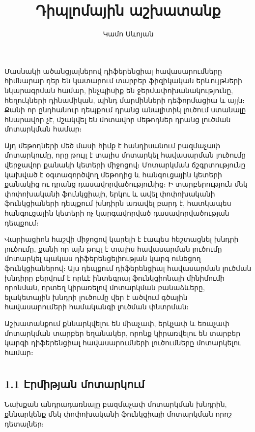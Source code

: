 \documentclass[fleqn, bachelor,subf,12pt,notitlepage]{article}
\title{Դիպլոմային աշխատանք}
\author{Կամո Սևոյան}
\begin{document}
\section*{}

\sloppy

\hspace{\parindent}Մասնակի ածանցյալներով դիֆերենցիալ հավասարումները հիմնարար դեր են կատարում տարբեր ֆիզիկական երևույթների նկարագրման համար, ինչպիսիք են ջերմափոխանակությունը, հեղուկների դինամիկան, պինդ մարմինների դեֆորմացիա և այլն։ Քանի որ ընդհանուր դեպքում դրանց անալիտիկ լուծում ստանալը հնարավոր չէ, մշակվել են մոտավոր մեթոդներ դրանց լուծման մոտարկման համար։ 

Այդ մեթոդների մեծ մասի հիմք է հանդիսանում բազմաչափ մոտարկումը, որը թույլ է տալիս մոտարկել հավասարման լուծումը վերջավոր քանակի կետերի միջոցով։
Մոտարկման ճշգրտությունը կախված է օգտագործվող մեթոդից և հանգուցային կետերի քանակից ու դրանց դասավորվածությունից։ Ի տարբերություն մեկ փոփոխականի ֆունկցիայի,  երկու և ավել փոփոխականի ֆունկցիաների դեպքում խնդիրն առավել բարդ է, հատկապես հանգուցային կետերի ոչ կարգավորված դասավորվածության դեպքում։

Վարիացիոն հաշվի միջոցով կարելի է էապես հեշտացնել խնդրի լուծումը, քանի որ այն թույլ է տալիս հավասարման լուծումը մոտարկել պակաս դիֆերենցելիության կարգ ունեցող ֆունկցիաներով։ Այս դեպքում դիֆերենցիալ հավասարման լուծման խնդիրը բերվում է որևէ ինտեգրալ ֆունկցիոնալի մինիմումի որոնման, որտեղ կիրառելով մոտարկման բանաձևերը, ելակետային խնդրի լուծումը վեր է ածվում գծային հավասարումերի համականգի լուծման փնտրման։

Աշխատանքում քննարկվելու են միաչափ, երկչափ և եռաչափ մոտարկման տարբեր եղանակեր, որոնք կիրառվելու են տարբեր կարգի դիֆերենցիալ հավասարումների լուծումները մոտարկելու համար։
\newpage


\section*{}
\subsection*{{1.1 Էրմիթյան մոտարկում}}
\hspace{\parindent}Նախքան անդրադառնալը բազմաչափ մոտարկման խնդրին, քննարկենք մեկ փոփոխականի ֆունկցիայի մոտարկման որոշ դետալներ։
\end{document}
